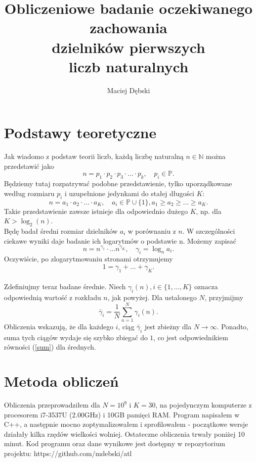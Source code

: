 \documentclass{report}
\title{Obliczeniowe badanie oczekiwanego zachowania \\ dzielników pierwszych \\ liczb naturalnych}
\author{Maciej Dębski}
\newcommand{\N}{\mathbb{N}}
\renewcommand{\P}{\mathbb{P}}
\newcommand{\set}[1]{\{#1\}}
\begin{document}
\maketitle

\chapter*{Podstawy teoretyczne}
Jak wiadomo z podstaw teorii liczb, każdą liczbę naturalną $n \in \N$ można przedstawić jako
$$ n = p_1 \cdot p_2 \cdot p_3 \cdot \ldots \cdot p_k, \quad p_i \in \P. $$
Będziemy tutaj rozpatrywać podobne przedstawienie, tylko uporządkowane według rozmiaru $p_i$ i uzupełnione jedynkami do stałej długości $K$:
$$ n = a_1 \cdot a_2 \cdot \ldots \cdot a_K, \quad a_i \in \P \cup \set{1}, a_1 \geq a_2 \geq \ldots \geq a_K. $$
Takie przedstawienie zawsze istnieje dla odpowiednio dużego $K$, np. dla $K > \log_2(n)$. \\

Będę badał średni rozmiar dzielników $a_i$ w porównaniu z $n$. W szczególności ciekawe wyniki daje badanie ich logarytmów o podstawie n. Możemy zapisać
$$ n = n^{\gamma_1} \cdot \ldots n^{\gamma_K}, \quad \gamma_i = \log_n{a_i}. $$
Oczywiście, po zlogarytmowaniu stronami otrzymujemy
\begin{equation} \label{sum} 1 = \gamma_1 + \ldots + \gamma_K. \end{equation} \\

Zdefiniujmy teraz badane średnie. Niech $\gamma_i(n), i \in \set{1, \ldots, K}$ oznacza odpowiednią wartość z rozkładu $n$, jak powyżej. Dla ustalonego $N$, przyjmijmy
$$ \bar{\gamma}_i = \frac{1}{N} \sum_{n=1}^{N} \gamma_i(n). $$
Obliczenia wskazują, że dla każdego $i$, ciąg $\bar{\gamma}_i$ jest zbieżny dla $N \to \infty$. Ponadto, suma tych ciągów wydaje się szybko zbiegać do $1$,
co jest odpowiednikiem równości (\ref{sum}) dla średnych.

\chapter*{Metoda obliczeń}

Obliczenia przeprowadziłem dla $N = 10^9$ i $K = 30$, na pojedynczym komputerze z procesorem i7-3537U (2.00GHz) i 10GB pamięci RAM.
Program napisałem w C++, a następnie mocno zoptymalizowałem i sprofilowałem - początkowe wersje działały kilka rzędów wielkości wolniej.
Ostateczne obliczenia trwały poniżej 10 minut. Kod programu oraz dane wynikowe jest dostępny w repozytorium projektu: https://github.com/mdebski/atl
\end{document}
